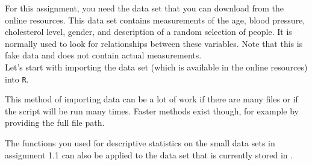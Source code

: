 \setcounter{section}{1}
\setcounter{subsection}{3}
\setcounter{question}{0}



For this assignment, you need the  data set that you can download from the online resources. This data set contains measurements of the age, blood pressure, cholesterol level, gender, and description of a random selection of people. It is normally used to look for relationships between these variables. Note that this is fake data and does not contain actual measurements. \\

Let’s start with importing the data set (which is available in the online resources) into \texttt{R}. \\


\twolineanswerbox

This method of importing data can be a lot of work if there are many files or if the script will be run many times. Faster methods exist though, for example by providing the full file path. \\



\twolineanswerbox 

\rcodeanswersmall

\clearpage %

The functions you used for descriptive statistics on the small data sets in assignment 1.1 can also be applied to the data set that is currently stored in . \\


